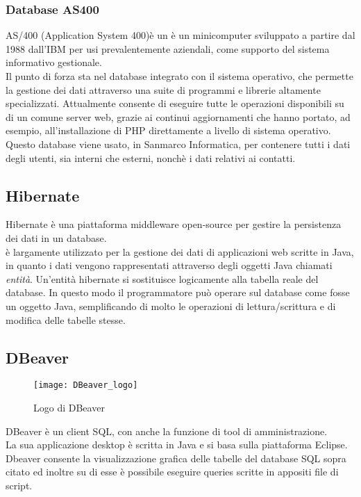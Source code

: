 \subsubsection{Database AS400}
AS/400 (Application System 400)è un è un minicomputer sviluppato a partire dal 1988 dall’IBM per usi prevalentemente aziendali, come supporto del sistema informativo gestionale.\\
Il punto di forza sta nel database integrato con il sistema operativo, che permette la gestione dei dati attraverso una suite di programmi e librerie altamente specializzati. Attualmente consente di eseguire tutte le operazioni disponibili su di un comune server web, grazie ai continui aggiornamenti che hanno portato, ad esempio, all'installazione di PHP direttamente a livello di sistema operativo.
Questo database viene usato, in Sanmarco Informatica, per contenere tutti i dati degli utenti, sia interni che esterni, nonchè i dati relativi ai contatti. %
\subsection{Hibernate}
Hibernate è una piattaforma \gls{middleware} open-source per gestire la persistenza dei dati in un database.\\
è largamente utilizzato per la gestione dei dati di applicazioni web scritte in Java, in quanto i dati vengono rappresentati attraverso degli oggetti Java chiamati \emph{entità}.
Un'entità hibernate si sostituisce logicamente alla tabella reale del database. In questo modo il programmatore può operare sul database come fosse un oggetto Java, semplificando di molto le operazioni di lettura/scrittura e di modifica delle tabelle stesse.
\subsection{DBeaver}

\begin{figure}[h]
	\centering
	\texttt{[image: DBeaver\_logo]}
	\caption{Logo di DBeaver}
\end{figure}
DBeaver è un client SQL, con anche la funzione di tool di amministrazione.\\
La sua applicazione desktop è scritta in Java e si basa sulla piattaforma Eclipse.\\
Dbeaver consente la visualizzazione grafica delle tabelle del database SQL sopra citato ed inoltre su di esse è possibile eseguire queries scritte in appositi file di script.
